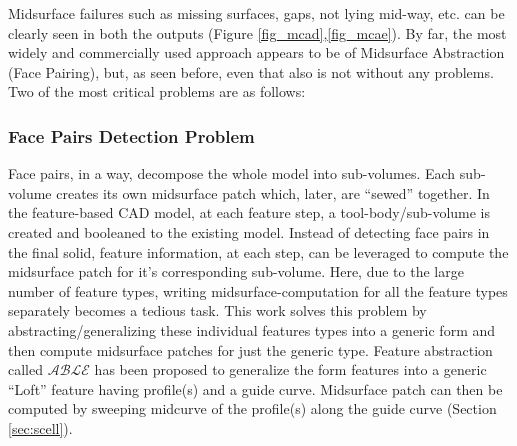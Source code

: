 Midsurface failures such as missing surfaces, gaps, not lying mid-way, etc. can be clearly seen in both the outputs (Figure \ref{fig_mcad},\ref{fig_mcae}). By far, the most widely and commercially used approach appears to be of Midsurface Abstraction (Face Pairing), but, as seen before, even that also is not without any problems. Two of the most critical problems are as follows:

	
\subsubsection{Face Pairs Detection Problem}  \label{sec:facepairdetection}
Face pairs, in a way, decompose the whole model into sub-volumes. Each sub-volume creates its own midsurface patch which, later, are ``sewed'' together. In the feature-based CAD model, at each feature step, a tool-body/sub-volume is created and booleaned to the existing model.  Instead of detecting face pairs in the final solid,  feature information, at each step, can be leveraged to compute the midsurface patch for it's corresponding sub-volume.    Here, due to the large number of feature types, writing midsurface-computation for all the feature types separately becomes a tedious task. This work solves this problem by abstracting/generalizing these individual features types into a generic form and then compute midsurface patches for just the generic type. Feature abstraction called $\mathcal{ABLE}$ has been proposed to generalize the form features into a generic ``Loft'' feature having profile(s) and a guide curve. Midsurface patch can then be computed by sweeping midcurve of the profile(s) along the guide curve (Section \ref{sec:scell}). %


